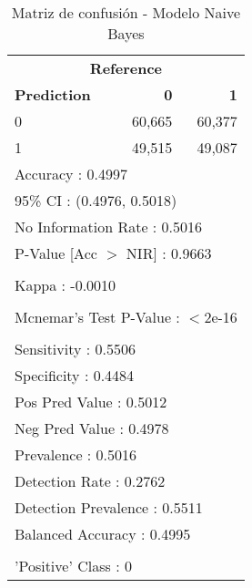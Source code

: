 \begin{table}[htbp]
\centering
\caption{Matriz de confusión - Modelo Naive Bayes}
\label{tab:14_matriz_naive_bayes}
\begin{tabular}{lrr}
\toprule
\multicolumn{3}{c}{\textbf{Reference}} \\
\textbf{Prediction} & \textbf{0} & \textbf{1} \\
\midrule
0 & 60,665 & 60,377 \\
1 & 49,515 & 49,087 \\
\midrule
\multicolumn{3}{l}{Accuracy : 0.4997} \\
\multicolumn{3}{l}{95\% CI : (0.4976, 0.5018)} \\
\multicolumn{3}{l}{No Information Rate : 0.5016} \\
\multicolumn{3}{l}{P-Value [Acc $>$ NIR] : 0.9663} \\
\\
\multicolumn{3}{l}{Kappa : -0.0010} \\
\\
\multicolumn{3}{l}{Mcnemar's Test P-Value : $<$2e-16} \\
\\
\multicolumn{3}{l}{Sensitivity : 0.5506} \\
\multicolumn{3}{l}{Specificity : 0.4484} \\
\multicolumn{3}{l}{Pos Pred Value : 0.5012} \\
\multicolumn{3}{l}{Neg Pred Value : 0.4978} \\
\multicolumn{3}{l}{Prevalence : 0.5016} \\
\multicolumn{3}{l}{Detection Rate : 0.2762} \\
\multicolumn{3}{l}{Detection Prevalence : 0.5511} \\
\multicolumn{3}{l}{Balanced Accuracy : 0.4995} \\
\\
\multicolumn{3}{l}{'Positive' Class : 0} \\
\bottomrule
\end{tabular}
\end{table}